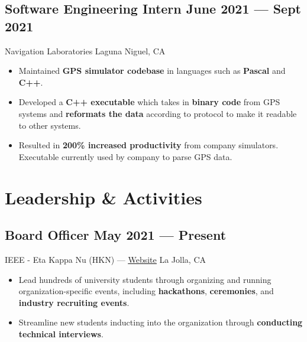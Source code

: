 \documentclass[a4,10pt]{article}
\newcommand{\subtext}[1]{
#1\par\vspace{-0.2cm}}
\newenvironment{zitemize}{
\begin{itemize}\itemsep0pt \parskip0pt \parsep1pt}
{\end{itemize}\vspace{-0.5cm}}
\begin{document}
\subsection*{Software Engineering Intern \hfill June 2021 --- Sept 2021} 
\subtext{Navigation Laboratories \hfill Laguna Niguel, CA} 
    \begin{zitemize}
        \item Maintained \textbf{GPS simulator codebase} in languages such as \textbf{Pascal} and \textbf{C++}.
        \item Developed a \textbf{C++ executable} which takes in \textbf{binary code} from GPS systems and \textbf{reformats the data} according to protocol to make it readable to other systems.
        \item Resulted in \textbf{200\% increased productivity} from company simulators. Executable currently used by company to parse GPS data.
    \end{zitemize}

\section{Leadership \& Activities}

        

\subsection*{Board Officer \hfill May 2021 --- Present} 
\subtext{IEEE - Eta Kappa Nu (HKN) —  {{\href{https://hkn.ucsd.edu}{\underline{\textcolor{linkblue}{Website}}}}} \hfill La Jolla, CA} 
    \begin{zitemize}
        \item Lead hundreds of university students through organizing and running organization-specific events, including \textbf{hackathons}, \textbf{ceremonies}, and \textbf{industry recruiting events}.
        \item Streamline new students inducting into the organization through \textbf{conducting technical interviews}.
    \end{zitemize}
\end{document}
